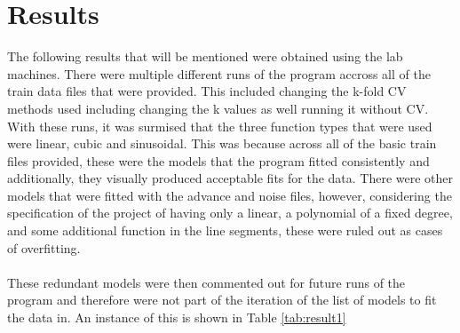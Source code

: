 \documentclass[a4paper,11pt]{article}
\begin{document}
\section{Results}
The following results that will be mentioned were obtained using the lab machines.
There were multiple different runs of the program accross all of the train data
files that were provided. This included changing the k-fold CV methods used including
changing the k values as well running it without CV. With these runs, it was
surmised that the three function types that were used were linear, cubic and sinusoidal.
This was because across all of the basic train files provided, these were the models
that the program fitted consistently and additionally, they visually produced
acceptable fits for the data. There were other models that were fitted with the
advance and noise files, however, considering the specification of the project of
having only a linear, a polynomial of a fixed degree, and some additional function
in the line segments, these were ruled out as cases of overfitting.
\\ \\
These redundant models were then commented out for future runs of the program
and therefore were not part of the iteration of the list of models to fit the data
in. An instance of this is shown in Table \ref{tab:result1}
\end{document}
